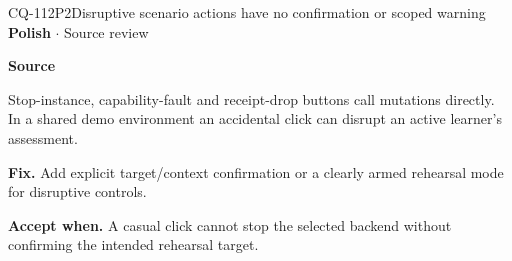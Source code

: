 \begin{finding}{CQ-112}{P2}{Disruptive scenario actions have no confirmation or scoped warning}
\textbf{Polish} $\cdot$ Source review\par
\textbf{Source}\quad{}\par
Stop-instance, capability-fault and receipt-drop buttons call mutations directly. In a shared demo environment an accidental click can disrupt an active learner's assessment.\par
\textbf{Fix.} Add explicit target/context confirmation or a clearly armed rehearsal mode for disruptive controls.\par
\textbf{Accept when.} A casual click cannot stop the selected backend without confirming the intended rehearsal target.
\end{finding}
\clearpage
